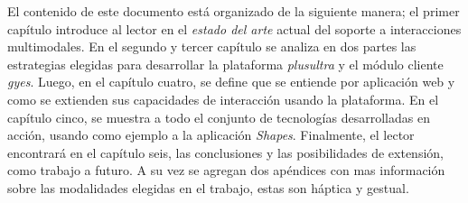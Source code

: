 El contenido de este documento está organizado de la siguiente manera; el primer capítulo introduce al lector en el \emph{estado del arte} actual del soporte a interacciones multimodales. En el segundo y tercer capítulo se analiza en dos partes las estrategias elegidas para desarrollar la plataforma \emph{plusultra} y el módulo cliente \emph{gyes}. Luego, en el capítulo cuatro, se define que se entiende por aplicación web y como se extienden sus capacidades de interacción usando la plataforma. En el capítulo cinco, se muestra a todo el conjunto de tecnologías desarrolladas en acción, usando como ejemplo a la aplicación \emph{Shapes}. Finalmente, el lector encontrará en el capítulo seis, las conclusiones y las posibilidades de extensión, como trabajo a futuro. A su vez se agregan dos apéndices con mas información sobre las modalidades elegidas en el trabajo, estas son háptica y gestual.

\endgroup			

\vfill